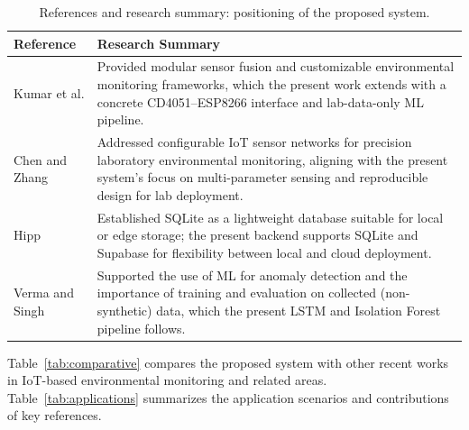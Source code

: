 \documentclass[journal,onecolumn]{IEEEtran}
\begin{document}
\begin{table}[h]
\centering
\caption{References and research summary: positioning of the proposed system.}
\label{tab:lit-positioning}
\small
\begin{tabular}{|p{}|p{}|}
\hline
\textbf{Reference} & \textbf{Research Summary} \\
\hline
Kumar et al. \cite{modularsensors2022} & Provided modular sensor fusion and customizable environmental monitoring frameworks, which the present work extends with a concrete CD4051--ESP8266 interface and lab-data-only ML pipeline. \\
\hline
Chen and Zhang \cite{labmonitoring2020} & Addressed configurable IoT sensor networks for precision laboratory environmental monitoring, aligning with the present system's focus on multi-parameter sensing and reproducible design for lab deployment. \\
\hline
Hipp \cite{sqlite2017} & Established SQLite as a lightweight database suitable for local or edge storage; the present backend supports SQLite and Supabase for flexibility between local and cloud deployment. \\
\hline
Verma and Singh \cite{mlanomaly2022} & Supported the use of ML for anomaly detection and the importance of training and evaluation on collected (non-synthetic) data, which the present LSTM and Isolation Forest pipeline follows. \\
\hline
\end{tabular}
\end{table}

Table~\ref{tab:comparative} compares the proposed system with other recent works in IoT-based environmental monitoring and related areas. Table~\ref{tab:applications} summarizes the application scenarios and contributions of key references.
\end{document}
